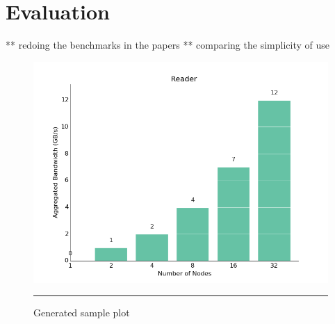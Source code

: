 
\chapter{Evaluation} %

\label{Chapter4} %


** redoing the benchmarks in the papers
** comparing the simplicity of use




\begin{figure}[H]
  \centering
    \includegraphics[scale=0.5]{Figures/reader.png}
    \rule{25em}{0.5pt}
  \caption[Generated sample plot]{Generated sample plot}
  \label{fig:architecture}
\end{figure}
